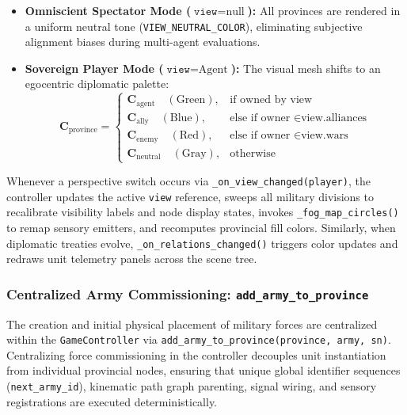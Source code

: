 \begin{itemize}
    \item \textbf{Omniscient Spectator Mode ($\texttt{view} = \text{null}$):} All provinces are rendered in a uniform neutral tone (\texttt{VIEW\_NEUTRAL\_COLOR}), eliminating subjective alignment biases during multi-agent evaluations.
    \item \textbf{Sovereign Player Mode ($\texttt{view} = \text{Agent}$):} The visual mesh shifts to an egocentric diplomatic palette:
    \begin{equation}
        \mathbf{C}_{\text{province}} = \begin{cases}
            \mathbf{C}_{\text{agent}} \quad (\text{Green}), & \text{if owned by } \text{view} \\
            \mathbf{C}_{\text{ally}} \quad (\text{Blue}), & \text{else if owner } \in \text{view.alliances} \\
            \mathbf{C}_{\text{enemy}} \quad (\text{Red}), & \text{else if owner } \in \text{view.wars} \\
            \mathbf{C}_{\text{neutral}} \quad (\text{Gray}), & \text{otherwise}
        \end{cases}
    \end{equation}
\end{itemize}

Whenever a perspective switch occurs via \texttt{\_on\_view\_changed(player)}, the controller updates the active \texttt{view} reference, sweeps all military divisions to recalibrate visibility labels and node display states, invokes \texttt{\_fog\_map\_circles()} to remap sensory emitters, and recomputes provincial fill colors. Similarly, when diplomatic treaties evolve, \texttt{\_on\_relations\_changed()} triggers color updates and redraws unit telemetry panels across the scene tree.

\subsubsection{Centralized Army Commissioning: \texttt{add\_army\_to\_province}}
The creation and initial physical placement of military forces are centralized within the \texttt{GameController} via \texttt{add\_army\_to\_province(province, army, sn)}. Centralizing force commissioning in the controller decouples unit instantiation from individual provincial nodes, ensuring that unique global identifier sequences (\texttt{next\_army\_id}), kinematic path graph parenting, signal wiring, and sensory registrations are executed deterministically.

